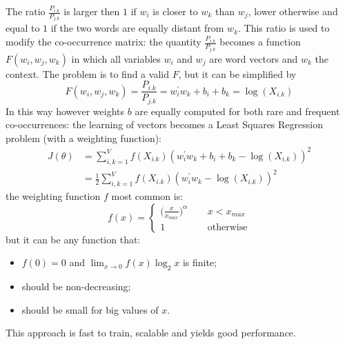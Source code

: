 \documentclass[11pt, a4page]{article}
\begin{document}
The ratio $\frac{P_{i.k}}{P_{j.k}}$ is larger then $1$ if $w_i$ is closer to $w_k$ than $w_j$, lower otherwise and equal to $1$ if the two words are equally distant from $w_k$.
This ratio is used to modify the co-occurrence matrix: the quantity $\frac{P_{i.k}}{P_{j.k}}$ becomes a function $F(w_i, w_j, w_k)$ in which all variables $w_i$ and $w_j$ are word vectors and $w_k$ the context.
The problem is to find a valid $F$, but it can be simplified by
\begin{equation*}
  F(w_i, w_j, w_k) = \frac{P_{i.k}}{P_{j.k}} = w_i^\prime w_k + b_i + b_k = \log(X_{i.k})
\end{equation*}
In this way however weights $b$ are equally computed for both rare and frequent co-occurrences: the learning of vectors becomes a Least Squares Regression problem (with a weighting function):
\begin{align*}
  J(\theta) &= \sum_{i, k = 1}^V f(X_{i.k})(w_i^\prime w_k + b_i + b_k - \log(X_{i.k}))^2 \\
   &= \frac{1}{2} \sum_{i, k = 1}^V f(X_{i.k})(w_i^\prime w_k - \log(X_{i.k}))^2
\end{align*}
the weighting function $f$ most common is:
\begin{equation*}
  f(x) = \begin{cases}
    \big( \frac{x}{x_{max}}\big)^\alpha \hspace{15pt}& x < x_{max} \\
    1 & \text{otherwise}
    \end{cases}
\end{equation*}
but it can be any function that:
\begin{itemize}[noitemsep]
\item $f(0) = 0$ and $\lim_{x \to 0}f(x) \log_2 x$ is finite;
\item should be non-decreasing;
\item should be small for big values of $x$.
\end{itemize}
This approach is fast to train, scalable and yields good performance.
\end{document}
